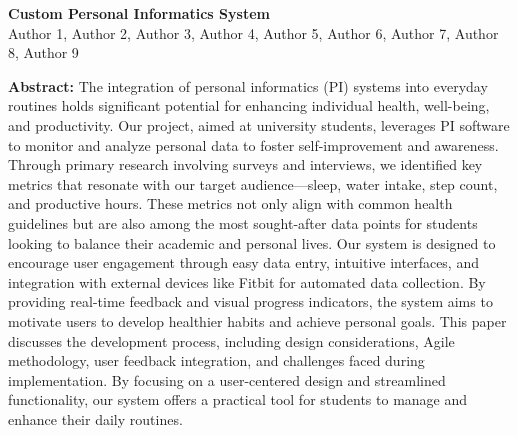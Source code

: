 \documentclass[12pt]{article}
\begin{document}
\begin{titlepage}
    \centering
    {\Huge \bfseries Custom Personal Informatics System}\\[0.2cm]
    \vspace*{0.5cm}
    {\large Author 1, Author 2, Author 3, Author 4, Author 5, Author 6, Author 7, Author 8, Author 9}\\[2cm] %
    \vspace*{1cm}

    \begin{minipage}{0.9\textwidth}

        \textbf{Abstract:} The integration of personal informatics (PI) systems
        into everyday routines holds significant potential for enhancing
        individual health, well-being, and productivity. Our project, aimed at
        university students, leverages PI software to monitor and analyze
        personal data to foster self-improvement and awareness. Through primary
        research involving surveys and interviews, we identified key metrics
        that resonate with our target audience—sleep, water intake, step count,
        and productive hours. These metrics not only align with common health
        guidelines but are also among the most sought-after data points for
        students looking to balance their academic and personal lives. Our
        system is designed to encourage user engagement through easy data
        entry, intuitive interfaces, and integration with external devices like
        Fitbit for automated data collection. By providing real-time feedback
        and visual progress indicators, the system aims to motivate users to
        develop healthier habits and achieve personal goals. This paper
        discusses the development process, including design considerations,
        Agile methodology, user feedback integration, and challenges faced
        during implementation. By focusing on a user-centered design and
        streamlined functionality, our system offers a practical tool for
        students to manage and enhance their daily routines.

    \end{minipage}
\end{titlepage}
\thispagestyle{fancy}

\newpage

\tableofcontents
\thispagestyle{empty}

\newpage

\setcounter{page}{1}
\end{document}
